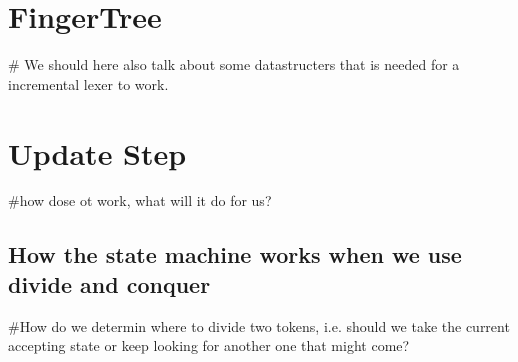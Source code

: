 \section{FingerTree}
\# We should here also talk about some datastructers that is needed for a
incremental lexer to work.

\section{Update Step}
\#how dose ot work, what will it do for us?

\subsection{How the state machine works when we use divide and conquer} %
\#How do we determin where to divide two tokens, i.e. should we take the current
  accepting state or keep looking for another one that might come?
